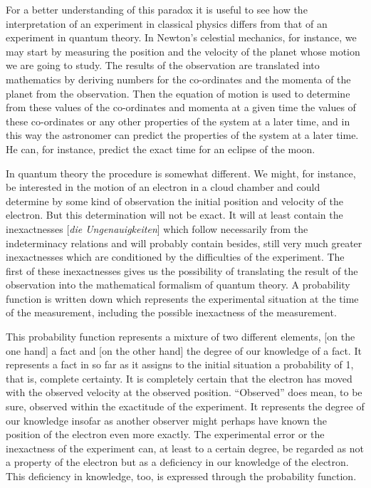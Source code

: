 For a better understanding of this paradox it is useful to see how the
interpretation of an experiment in classical physics differs from that
of an experiment in quantum theory. In Newton's celestial mechanics, for
instance, we may start by measuring the position and the velocity of the
planet whose motion we are going to study. The results of the
observation are translated into mathematics by deriving numbers for the
co-ordinates and the momenta of the planet from the observation. Then
the equation of motion is used to determine from these values of the
co-ordinates and momenta at a given time the values of these
co-ordinates or any other properties of the system at a later time, and
in this way the astronomer can predict the properties of the system at a
later time. He can, for instance, predict the exact time for an eclipse
of the moon.

In quantum theory the procedure is somewhat different. We might, for
instance, be interested in the motion of an electron in a cloud chamber
and could determine by some kind of observation the initial position and
velocity of the electron. But this determination will not be exact. It
will at least contain the inexactnesses {[}\emph{die Ungenauigkeiten}{]}
which follow necessarily from the indeterminacy relations and will
probably contain besides, still very much greater inexactnesses which
are conditioned by the difficulties of the experiment. The first of
these inexactnesses gives us the possibility of translating the result
of the observation into the mathematical formalism of quantum theory. A
probability function is written down which represents the experimental
situation at the time of the measurement, including the possible
inexactness of the measurement.

This probability function represents a mixture of two different
elements, {[}on the one hand{]} a fact and {[}on the other hand{]} the
degree of our knowledge of a fact. It represents a fact in so far as it
assigns to the initial situation a probability of 1, that is, complete
certainty. It is completely certain that the electron has moved with the
observed velocity at the observed position. ``Observed'' does mean, to
be sure, observed within the exactitude of the experiment. It represents
the degree of our knowledge insofar as another observer might perhaps
have known the position of the electron even more exactly. The
experimental error or the inexactness of the experiment can, at least to
a certain degree, be regarded as not a property of the electron but as a
deficiency in our knowledge of the electron. This deficiency in
knowledge, too, is expressed through the probability function.

